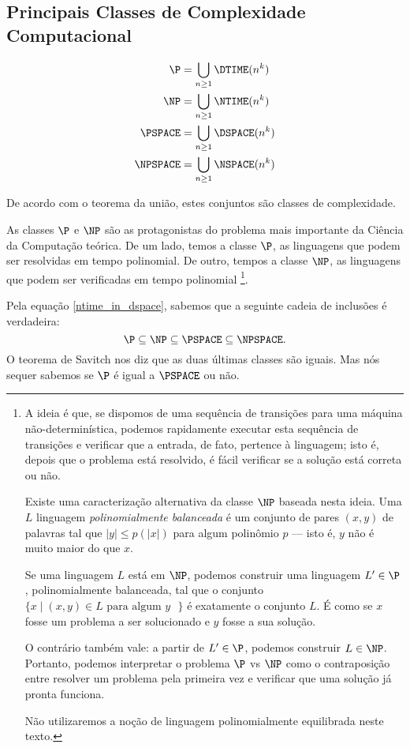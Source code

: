\subsection{Principais Classes de Complexidade Computacional}
\label{principais_classes}

\begin{definition}
    \begin{align*}
        \P &= \bigcup_{n \geq 1} \DTIME(n^k) \\
        \NP &= \bigcup_{n \geq 1} \NTIME(n^k) \\
        \PSPACE &= \bigcup_{n \geq 1} \DSPACE(n^k) \\
        \NPSPACE &= \bigcup_{n \geq 1} \NSPACE(n^k) \\
    \end{align*}
\end{definition}

De acordo com o teorema da união,
estes conjuntos são classes de complexidade.

As classes $\P$ e $\NP$ são as protagonistas
do problema mais importante da Ciência da Computação teórica.
De um lado, temos a classe $\P$,
as linguagens que podem ser resolvidas em tempo polinomial.
De outro, tempos a classe $\NP$,
as linguagens que podem ser verificadas em tempo polinomial%
\footnote{
    A ideia é que,
    se dispomos de uma sequência de transições para uma máquina não-determinística,
    podemos rapidamente executar esta sequência de transições
    e verificar que a entrada, de fato, pertence à linguagem;
    isto é, depois que o problema está resolvido,
    é fácil verificar se a solução está correta ou não.

    Existe uma caracterização alternativa da classe $\NP$ baseada nesta ideia.
    Uma $L$ linguagem \emph{polinomialmente balanceada}
    é um conjunto de pares $(x, y)$ de palavras
    tal que $|y| \leq p(|x|)$ para algum polinômio $p$
    \cite[p. 298]{Papadimitriou1998}
    --- isto é, $y$ não é muito maior do que $x$.

    Se uma linguagem $L$ está em $\NP$,
    podemos construir uma linguagem $L' \in \P$,
    polinomialmente balanceada,
    tal que o conjunto $\{x \mid (x, y) \in L \text{ para algum $y$ }\}$
    é exatamente o conjunto $L$.
    É como se $x$ fosse um problema a ser solucionado
    e $y$ fosse a sua solução.

    O contrário também vale: a partir de $L' \in \P$,
    podemos construir $L \in \NP$.
    Portanto, podemos interpretar o problema $\P$ vs $\NP$
    como o contraposição entre resolver um problema pela primeira vez
    e verificar que uma solução já pronta funciona.

    Não utilizaremos a noção de linguagem polinomialmente equilibrada neste texto.
}.

Pela equação \ref{ntime_in_dspace},
sabemos que a seguinte cadeia de inclusões é verdadeira:
\begin{equation*}
    \P \subseteq \NP \subseteq \PSPACE \subseteq \NPSPACE.
\end{equation*}
O teorema de Savitch nos diz que as duas últimas classes são iguais.
Mas nós sequer sabemos se $\P$ é igual a $\PSPACE$ ou não.
